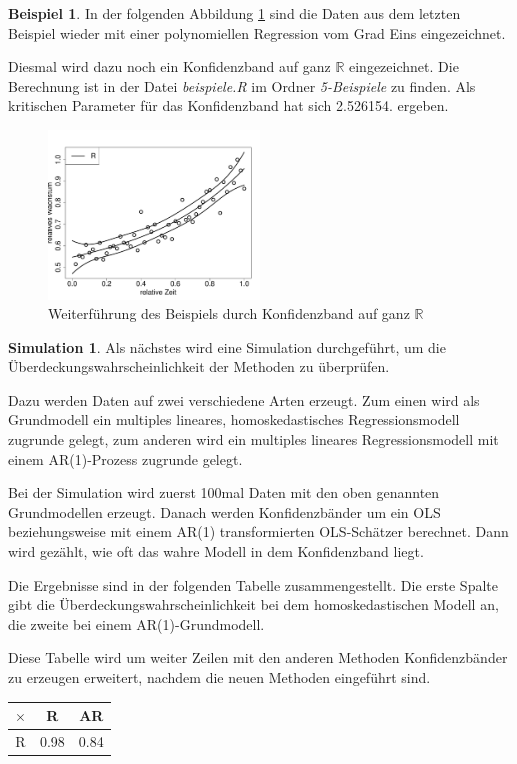 \documentclass[12pt,a4paper]{article}
\theoremstyle{definition}
\newtheorem{Beispiel}[Definition]{Beispiel}
\theoremstyle{definition}
\theoremstyle{definition}
\newtheorem{Simulation}[Definition]{Simulation}
\theoremstyle{definition}
\newcommand{\cR}{2.526154}
\newcommand{\ntest}{100}
\newcommand{\UeberRR}{0.98}
\newcommand{\UeberARR}{0.84}
\begin{document}
\begin{Beispiel}
In der folgenden Abbildung \ref{KB-ganz-R-BSP} sind die Daten aus dem letzten Beispiel wieder mit einer polynomiellen Regression vom Grad Eins eingezeichnet.

Diesmal wird dazu noch ein Konfidenzband auf ganz $\mathbb{R}$ eingezeichnet. Die Berechnung ist in der Datei \textit{beispiele.R} im Ordner \textit{5-Beispiele} zu finden. Als kritischen Parameter für das Konfidenzband hat sich \cR . ergeben.

\begin{figure}[H] 
  \centering
     \includegraphics[width=0.5\textwidth]{Bsp-KB-R}
  \caption{Weiterführung des Beispiels durch Konfidenzband auf ganz $\mathbb{R}$}
  \label{KB-ganz-R-BSP}
\end{figure}

\end{Beispiel}

\begin{Simulation}
Als nächstes wird eine Simulation durchgeführt, um die Überdeckungswahrscheinlichkeit der Methoden zu überprüfen.

Dazu werden Daten auf zwei verschiedene Arten erzeugt. Zum einen wird als Grundmodell ein multiples lineares, homoskedastisches Regressionsmodell zugrunde gelegt, zum anderen wird ein multiples lineares Regressionsmodell mit einem AR(1)-Prozess zugrunde gelegt. 

Bei der Simulation wird zuerst \ntest mal Daten mit den oben genannten Grundmodellen erzeugt. Danach werden Konfidenzbänder um ein OLS beziehungsweise mit einem AR(1) transformierten OLS-Schätzer berechnet. Dann wird gezählt, wie oft das wahre Modell in dem Konfidenzband liegt. 

Die Ergebnisse sind in der folgenden Tabelle zusammengestellt. Die erste Spalte gibt die Überdeckungswahrscheinlichkeit bei dem homoskedastischen Modell an, die zweite bei einem AR(1)-Grundmodell. 

Diese Tabelle wird um weiter Zeilen mit den anderen Methoden Konfidenzbänder zu erzeugen erweitert, nachdem die neuen Methoden eingeführt sind.

\begin{center}
\begin{tabular}{|c|c|c|}
\hline 
$\times$ & R & AR \\ 
\hline 
R & \UeberRR & \UeberARR \\ 
\hline 
\end{tabular}
\end{center}

\end{Simulation}
\end{document}
